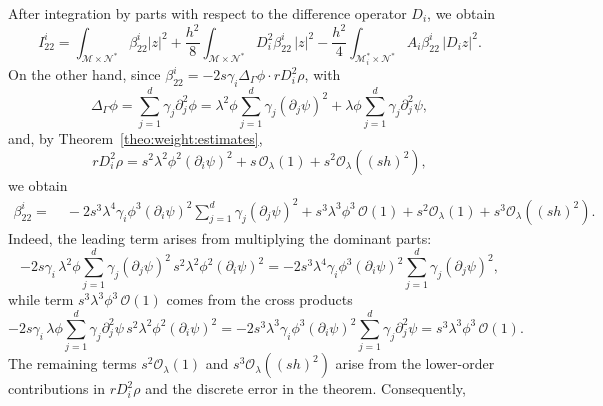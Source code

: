 \documentclass[11pt,oneside,leqno]{amsart}
\numberwithin{equation}{section}
\numberwithin{equation}{section}
\begin{document}
After integration by parts with respect to the difference operator $D_{i}$, we obtain
\begin{equation*}
    I_{22}^{i}=\int_{\mathcal{M}\times\mathcal{N}^{\ast}} \beta_{22}^{i}|z|^{2}+\frac{h^{2}}{8}\int_{\mathcal{M}\times\mathcal{N}^{\ast}}D_{i}^{2}\beta_{22}^{i}\,|z|^{2}-\frac{h^{2}}{4}\int_{\mathcal{M}_{i}^{\ast}\times\mathcal{N}^{\ast}}A_{i}\beta_{22}^{i}\,|D_{i}z|^{2}.
\end{equation*}
On the other hand, since $\beta_{22}^{i}=-2s\gamma_{i}\Delta_{\Gamma}\phi\cdot rD_{i}^{2}\rho$, with
\begin{equation*}
\Delta_{\Gamma}\phi=\sum_{j=1}^{d}\gamma_{j}\partial_{j}^{2}\phi=\lambda^{2}\phi\sum_{j=1}^{d}\gamma_{j}(\partial_{j}\psi)^{2}+\lambda\phi\sum_{j=1}^{d}\gamma_{j}\partial_{j}^{2}\psi,
\end{equation*}
and, by Theorem~\ref{theo:weight:estimates},
\begin{equation*}
rD_{i}^{2}\rho=s^{2}\lambda^{2}\phi^{2}(\partial_{i}\psi)^{2}+s\,\mathcal{O}_{\lambda}(1)+s^{2}\mathcal{O}_{\lambda}((sh)^{2}),
\end{equation*}
we obtain
\begin{equation}\label{eq:beta22:i:estimate}
\begin{aligned}
\beta_{22}^{i}=&\;-2s^{3}\lambda^{4}\gamma_{i}\phi^{3}(\partial_{i}\psi)^{2}\sum_{j=1}^{d}\gamma_{j}(\partial_{j}\psi)^{2}+s^{3}\lambda^{3}\phi^{3}\,\mathcal{O}(1)+s^{2}\mathcal{O}_{\lambda}(1)+s^{3}\mathcal{O}_{\lambda}((sh)^{2}).
\end{aligned}
\end{equation}
Indeed, the leading term arises from multiplying the dominant parts:
\begin{equation*}
-2s\gamma_{i}\,\lambda^{2}\phi\sum_{j=1}^{d}\gamma_{j}(\partial_{j}\psi)^{2}\, s^{2}\lambda^{2}\phi^{2}(\partial_{i}\psi)^{2}=-2s^{3}\lambda^{4}\gamma_{i}\phi^{3}(\partial_{i}\psi)^{2}\sum_{j=1}^{d}\gamma_{j}(\partial_{j}\psi)^{2},
\end{equation*}
while term $s^{3}\lambda^{3}\phi^{3}\,\mathcal{O}(1)$ comes from the cross products
\begin{equation*}
-2s\gamma_{i}\,\lambda\phi\sum_{j=1}^{d}\gamma_{j}\partial_{j}^{2}\psi\, s^{2}\lambda^{2}\phi^{2}(\partial_{i}\psi)^{2}=-2s^{3}\lambda^{3}\gamma_{i}\phi^{3}(\partial_{i}\psi)^{2}\sum_{j=1}^{d}\gamma_{j}\partial_{j}^{2}\psi=s^{3}\lambda^{3}\phi^{3}\,\mathcal{O}(1).
\end{equation*}
The remaining terms $s^{2}\mathcal{O}_{\lambda}(1)$ and $s^{3}\mathcal{O}_{\lambda}((sh)^{2})$ arise from the lower-order contributions in $rD_{i}^{2}\rho$ and the discrete error in the theorem. Consequently, 
\end{document}
